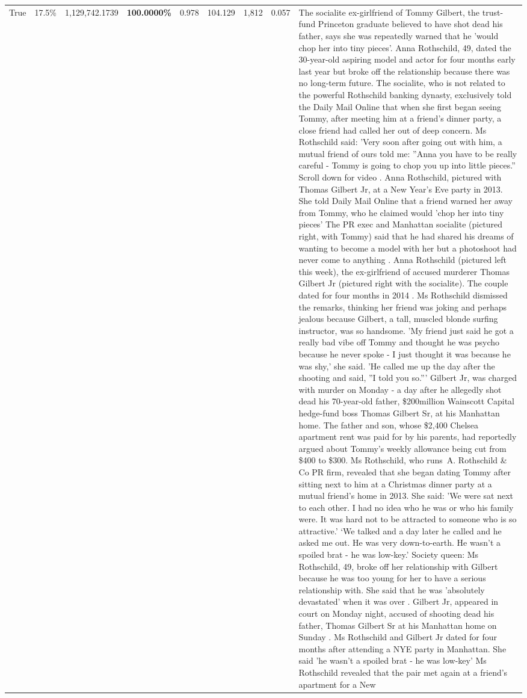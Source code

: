\begin{table}[H]
\begin{tabular}{lllrlllll}
True & 17.5\% & 1,129,742.1739 & \bfseries \color{red} 100.0000\% & 0.978 & 104.129 & 1,812 & 0.057 & The socialite ex-girlfriend of Tommy Gilbert, the trust-fund Princeton graduate believed to have shot dead his father, says she was repeatedly warned that he 'would chop her into tiny pieces'. Anna Rothschild, 49, dated the 30-year-old aspiring model and actor for four months early last year but broke off the relationship because there was no long-term future. The socialite, who is not related to the powerful Rothschild banking dynasty, exclusively told the Daily Mail Online that when she first began seeing Tommy, after meeting him at a friend's dinner party, a close friend had called her out of deep concern. Ms Rothschild said: 'Very soon after going out with him, a mutual friend of ours told me: ''Anna you have to be really careful - Tommy is going to chop you up into little pieces.'' Scroll down for video . Anna Rothschild, pictured with Thomas Gilbert Jr, at a New Year's Eve party in 2013. She told Daily Mail Online that a friend warned her away from Tommy, who he claimed would 'chop her into tiny pieces' The PR exec and Manhattan socialite (pictured right, with Tommy) said that he had shared his dreams of wanting to become a model with her but a photoshoot had never come to anything . Anna Rothschild (pictured left this week), the ex-girlfriend of accused murderer Thomas Gilbert Jr (pictured right with the socialite). The couple dated for four months in 2014 . Ms Rothschild dismissed the remarks, thinking her friend was joking and perhaps jealous because Gilbert, a tall, muscled blonde surfing instructor, was so handsome. 'My friend just said he got a really bad vibe off Tommy and thought he was psycho because he never spoke - I just thought it was because he was shy,' she said. 'He called me up the day after the shooting and said, ''I told you so.''' Gilbert Jr, was charged with murder on Monday - a day after he allegedly shot dead his 70-year-old father, \$200million Wainscott Capital hedge-fund boss Thomas Gilbert Sr, at his Manhattan home. The father and son, whose \$2,400 Chelsea apartment rent was paid for by his parents, had reportedly argued about Tommy's weekly allowance being cut from \$400 to \$300. Ms Rothschild, who runs A. Rothschild \& Co PR firm, revealed that she began dating Tommy after sitting next to him at a Christmas dinner party at a mutual friend's home in 2013. She said: 'We were sat next to each other. I had no idea who he was or who his family were. It was hard not to be attracted to someone who is so attractive.' ‘We talked and a day later he called and he asked me out. He was very down-to-earth. He wasn’t a spoiled brat - he was low-key.’ Society queen: Ms Rothschild, 49, broke off her relationship with Gilbert because he was too young for her to have a serious relationship with. She said that he was 'absolutely devastated' when it was over . Gilbert Jr, appeared in court on Monday night, accused of shooting dead his father, Thomas Gilbert Sr at his Manhattan home on Sunday . Ms Rothschild and Gilbert Jr dated for four months after attending a NYE party in Manhattan. She said 'he wasn't a spoiled brat - he was low-key' Ms Rothschild revealed that the pair met again at a friend’s apartment for a New 
\end{tabular}
\end{table}
